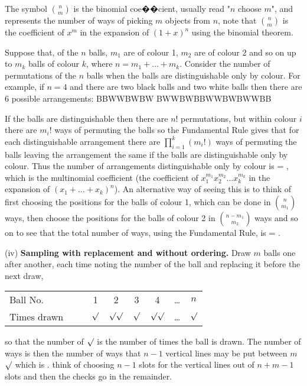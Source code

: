 \begin{example}
The symbol $\binom{n}{m}$ is the binomial coe��cient, usually read "$n$ choose $m$", and represents the number of ways of picking $m$ objects from $n$, note that $\binom{n}{m}$ is the coefficient of
$x^m$ in the expansion of $(1 + x)^n$ using the binomial theorem.

Suppose that, of the $n$ balls, $m_1$ are of colour 1, $m_2$ are of colour 2 and so on up to $m_k$ balls of colour $k$, where $n = m_1 + \dots + m_k$. Consider the number of permutations of the $n$
balls when the balls are distinguishable only by colour. For example, if $n = 4$ and there are two black balls and two white balls then there are 6 possible arrangements: \be BBWW\quad BWBW\quad
BWWB\quad WBBW\quad WBWB\quad WWBB \ee

If the balls are distinguishable then there are $n!$ permutations, but within colour $i$ there are $m_i!$ ways of permuting the balls so the Fundamental Rule gives that for each distinguishable
arrangement there are $\prod^k_{i=1} (m_i!)$ ways of permuting the balls leaving the arrangement the same if the balls are distinguishable only by colour. Thus the number of arrangements
distinguishable only by colour is \be {} = , \ee which is the multinomial coefficient (the coefficient of $x^{m_1}_1 x^{m_2}_2 \dots x^{m_k}_k$ in
the expansion of $(x_1 + \dots + x_k)^n$). An alternative way of seeing this is to think of first choosing the positions for the balls of colour 1, which can be done in $\binom{n}{m_1}$ ways, then
choose the positions for the balls of colour 2 in $\binom{n- m_1}{m_2}$ ways and so on to see that the total number of ways, using the Fundamental Rule, is \be {}
 \cdots {} = . \ee

\item [(iv)] {\bf Sampling with replacement and without ordering.} Draw $m$ balls one after another, each time noting the number of the ball and replacing it before the next draw,
\begin{center}
\begin{tabular}{lcc c|c|c|c|c|c}
Ball No. & & & 1 & 2 & 3 & 4 & \dots & $n$\\
Times drawn & & & $\surd$ & $\surd\surd$ & $\surd$ & $\surd\surd$ & \dots & $\surd$\\
\end{tabular}
\end{center}

so that the number of $\surd$ is the number of times the ball is drawn. The number of ways is then the number of ways that $n - 1$ vertical lines may be put between $m$ $\surd$ which is
\be
{}.
\ee
think of choosing $n-1$ slots for the vertical lines out of $n+m-1$ slots and then the checks go in the remainder.
\een
\end{example}

